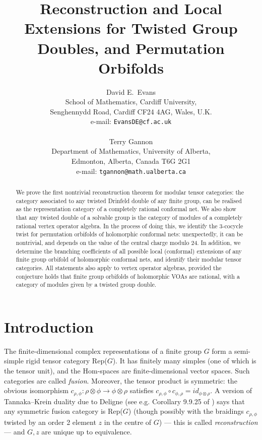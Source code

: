 \documentclass[12pt]{article}
\title{Reconstruction and Local Extensions for Twisted Group Doubles, and Permutation Orbifolds}
\author{
{\sc David E.\ Evans}\\
 {\footnotesize School of Mathematics, Cardiff University,}\\
 {\footnotesize Senghennydd Road, Cardiff CF24 4AG, Wales, U.K.}\\
 {\footnotesize e-mail: {\tt EvansDE@cf.ac.uk}}\\ \\
 {\sc Terry  Gannon }\\
 {\footnotesize Department of Mathematics, University of Alberta,}\\
{\footnotesize Edmonton, Alberta, Canada T6G 2G1}\\
{\footnotesize e-mail: {\tt tgannon@math.ualberta.ca}} }
\numberwithin{equation}{section}
\begin{document}
\maketitle

\begin{abstract} 
We prove the first nontrivial reconstruction theorem for modular tensor categories:  the category associated to any twisted Drinfeld
double of any finite group, can be realised as the representation category of a completely rational conformal net. We also show that any twisted double of a solvable  group is the category of modules of  a completely rational  vertex operator algebra. In the process of doing this, we identify the 3-cocycle twist for permutation orbifolds of holomorphic conformal nets: unexpectedly, it can be nontrivial, and depends on the value of the central charge modulo 24. In  addition, we determine the branching coefficients of all possible {local (conformal)} extensions of any finite group orbifold of
holomorphic conformal nets, and identify their modular tensor categories. All statements also apply to vertex operator algebras, provided the conjecture holds that finite group orbifolds of holomorphic VOAs are rational, with a category of modules given by a twisted group double.  

\end{abstract}

{\footnotesize
\tableofcontents
}

  

\section{Introduction}

The finite-dimensional complex representations of a finite group $G$ form a semi-simple rigid tensor category Rep($G$). It has finitely many simples (one of which is the tensor unit), and the Hom-spaces are finite-dimensional vector spaces. Such categories are called  \textit{fusion}. Moreover, the tensor product is symmetric: the obvious isomorphism $c_{\rho,\phi}:\rho\otimes\phi\rightarrow
\phi\otimes\rho$ satisfies $c_{\rho,\phi}\circ c_{\phi,\rho}=id_{\phi\otimes\rho}$.  A version of Tannaka--Krein duality due to Deligne (see e.g. Corollary 9.9.25 of \cite{EGNO}) says that any symmetric fusion category is Rep($G$) (though possibly with the braidings $c_{\rho,\phi}$ twisted by an order 2 element $z$ in the centre of $G$) --- this is called \textit{reconstruction} --- and $G,z$ are unique up to equivalence.
\end{document}
